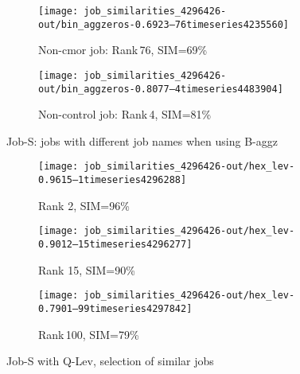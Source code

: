 \documentclass{jhps}
\begin{document}
\begin{figure}[bt]
\centering
\begin{subfigure}{0.47\textwidth}
\centering
\texttt{[image: job\_similarities\_4296426-out/bin\_aggzeros-0.6923--76timeseries4235560]}
\caption{Non-cmor job: Rank\,76, SIM=69\%}
\end{subfigure}
\qquad
\begin{subfigure}{0.47\textwidth}
\centering
\texttt{[image: job\_similarities\_4296426-out/bin\_aggzeros-0.8077--4timeseries4483904]}
\caption{Non-control job: Rank\,4, SIM=81\%}
\end{subfigure}

\caption{Job-S: jobs with different job names when using B-aggz}%
\label{fig:job-S-bin-agg}
\end{figure}


\begin{figure}[bt]
\begin{subfigure}{0.47\textwidth}
\centering
\texttt{[image: job\_similarities\_4296426-out/hex\_lev-0.9615--1timeseries4296288]}
\caption{Rank 2, SIM=96\%}
\end{subfigure}
\begin{subfigure}{0.47\textwidth}
\centering
\texttt{[image: job\_similarities\_4296426-out/hex\_lev-0.9012--15timeseries4296277]}
\caption{Rank 15, SIM=90\%}
\end{subfigure}
\begin{subfigure}{0.47\textwidth}
\centering
\texttt{[image: job\_similarities\_4296426-out/hex\_lev-0.7901--99timeseries4297842]}
\caption{Rank\,100, SIM=79\%}
\end{subfigure}

\caption{Job-S with Q-Lev, selection of similar jobs}%
\label{fig:job-S-hex-lev}
\end{figure}

%
\end{document}
